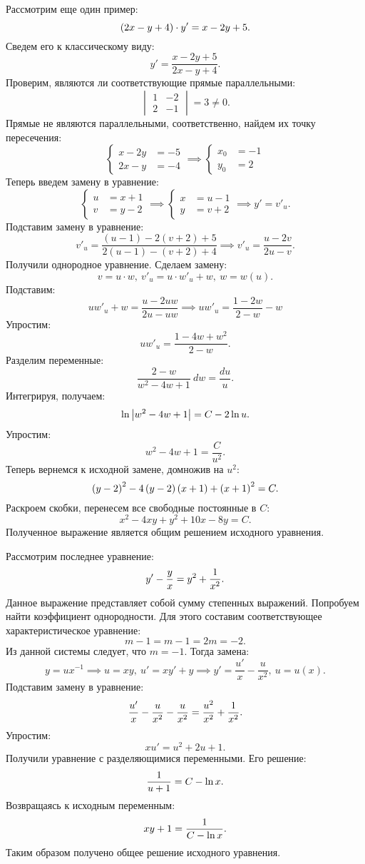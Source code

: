 		Рассмотрим еще один пример:
		\[ \left( 2x - y + 4 \right) \cdot y' = x - 2y + 5. \]
		Сведем его к классическому виду:
		\[ y' = \frac{x - 2y + 5}{2x - y + 4}. \]
		Проверим, являются ли соответствующие прямые параллельными:
		\[ \begin{vmatrix} 1 & -2 \\ 2 & -1 \end{vmatrix} = 3 \neq 0. \]
		Прямые не являются параллельными, соответственно, найдем их точку пересечения:
		\[ \left\lbrace \begin{split} x - 2y &= -5 \\ 2x - y &= -4 \end{split} \right. \implies \left\lbrace \begin{split} x_0 &= -1 \\ y_0 &= 2 \end{split} \right. \]
		Теперь введем замену в уравнение:
		\[ \left\lbrace \begin{split} u &= x + 1 \\ v &= y - 2 \end{split} \right. \implies \left\lbrace \begin{split} x &= u - 1 \\ y &= v + 2 \end{split} \right. \implies y' = v'_u. \]
		Подставим замену в уравнение:
		\[ v'_u = \frac{(u - 1) - 2(v + 2) + 5}{2 (u - 1) - (v + 2) + 4} \implies v'_u = \frac{u - 2v}{2u - v}. \]
		Получили однородное уравнение. Сделаем замену:
		\[ v = u \cdot w, ~ v'_u = u \cdot w'_u + w, ~ w = w(u). \]
		Подставим:
		\[ uw'_u + w = \frac{u - 2uw}{2u - uw} \implies uw'_u = \frac{1 - 2w}{2 - w} - w \]
		Упростим:
		\[ uw'_u = \frac{1 - 4w + w^2}{2 - w}. \]
		Разделим переменные:
		\[ \frac{2 - w}{w^2 - 4w + 1} ~ dw = \frac{du}{u}. \]
		Интегрируя, получаем:
		\[ \ln\left\vert w^2 - 4w + 1 \right\vert = C - 2 \ln{u}. \]
		Упростим:
		\[ w^2 - 4w + 1 = \frac{C}{u^2}. \]
		Теперь вернемся к исходной замене, домножив на $u^2$:
		\[ \left( y - 2 \right)^2 - 4 \left( y - 2 \right) \left( x + 1 \right) + \left( x + 1 \right)^2 = C. \]
		Раскроем скобки, перенесем все свободные постоянные в $C$:
		\[ x^2 - 4xy + y^2 + 10x - 8 y = C. \]
		Полученное выражение является общим решением исходного уравнения.

		Рассмотрим последнее уравнение:
		\[ y' - \frac{y}{x} = y^2 + \frac{1}{x^2}. \]
		Данное выражение представляет собой сумму степенных выражений. Попробуем найти коэффициент однородности. Для этого составим соответствующее характеристическое уравнение:
		\[ m - 1 = m - 1 = 2m = -2. \]
		Из данной системы следует, что $m = -1$.
		Тогда замена:
		\[ y = ux^{-1} \implies u = xy, ~ u' = xy' + y \implies y' = \frac{u'}{x} - \frac{u}{x^2}, ~ u = u(x). \]
		Подставим замену в уравнение:
		\[ \frac{u'}{x} - \frac{u}{x^2} - \frac{u}{x^2} = \frac{u^2}{x^2} + \frac{1}{x^2}. \]
		Упростим:
		\[ xu' = u^2 + 2u + 1. \]
		Получили уравнение с разделяющимися переменными. Его решение:
		\[ \frac{1}{u + 1} = C - \ln{x}. \]
		Возвращаясь к исходным переменным:
		\[ xy + 1 = \frac{1}{C - \ln{x}}. \]
		Таким образом получено общее решение исходного уравнения.


